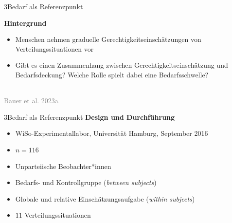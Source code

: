 \documentclass[xcolor=table,9pt,aspectratio=169]{beamer}
\begin{document}
\begin{frame}{\vspace*{10mm}3\hspace*{1em}Bedarf als Referenzpunkt}
\begin{multicols}{2}
   \textbf{Hintergrund}\\
   \medskip
   \begin{itemize}
      \item Menschen nehmen graduelle Gerechtigkeitseinschätzungen von Verteilungssituationen vor
      \item Gibt es einen Zusammenhang zwischen Gerechtigkeitseinschätzung und Bedarfsdeckung? Welche Rolle spielt dabei eine Bedarfsschwelle?
   \end{itemize}
   \vfill
   \begin{center}
      \\
      \textcolor{gray}{Bauer et al. 2023a}
   \end{center}
\end{multicols}
\end{frame}


\begin{frame}{\vspace*{10mm}3\hspace*{1em}Bedarf als Referenzpunkt}
\textbf{Design und Durchführung}\\
\medskip
\begin{itemize}
   \item WiSo-Experimentallabor, Universität Hamburg, September 2016
   \item $n=116$
   \item Unparteiische Beobachter*innen
   \item Bedarfs- und Kontrollgruppe (\textit{between subjects})
   \item Globale und relative Einschätzungsaufgabe (\textit{within subjects})
   \item $11$ Verteilungssituationen
\end{itemize}
\end{frame}
\end{document}
